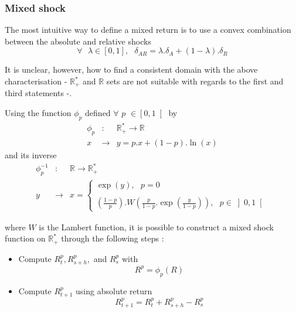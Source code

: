 \documentclass[10pt,a4paper]{report}
\begin{document}
\subsubsection{Mixed shock}

The most intuitive way to define a mixed return is to use a convex
combination between the absolute and relative shocks 
\begin{equation*}
\forall \text{ }\lambda \in \left[ 0,1\right] ,\text{ \ \ }\delta
_{AR}=\lambda .\delta _{A}+(1-\lambda ).\delta _{R}
\end{equation*}

It is unclear, however, how to find a consistent domain with the above
characterisation - $\mathbb{R}_{+}^{\ast }$ and $\mathbb{R}$ sets are not
suitable with regards to the first and third statements -.\\ 

\bigskip


Using the function $\phi _{p}$ defined $\forall $ $p$ $\in \left[ 0,1\right[ 
$ by%
\begin{eqnarray*}
\phi _{p} &:&\mathbb{R}_{+}^{\ast }\rightarrow \mathbb{R} \\
x &\rightarrow &y=p.x+(1-p).\ln (x)
\end{eqnarray*}%
and its inverse 
\begin{eqnarray*}
\phi _{p}^{-1} &:&\mathbb{R}\rightarrow \mathbb{R}_{+}^{\ast } \\
y &\rightarrow &x=\left\{ 
\begin{array}{c}
\exp (y),\text{ \ \ \ \ \ \ \ \ \ \ \ \ \ \ \ \ \ \ \ \ \ \ \ \ \ }p=0 \\ 
\\ 
\left( \frac{1-p}{p}\right) .W\left( \frac{p}{1-p}.\exp \left( \frac{y}{1-p}%
\right) \right) ,\text{ }p\in \left] 0,1\right[ 
\end{array}%
\right. 
\end{eqnarray*}

where $W$ is the Lambert function, it is possible to construct a mixed shock
function on $\mathbb{R}_{+}^{\ast }$ through the following steps :

\bigskip

\begin{itemize}
\item Compute $R_{t}^{p},R_{s+h}^{p},$ and $R_{s}^{p}$ with 
\begin{equation*}
R^{p}=\phi _{p}(R)
\end{equation*}

\item Compute $R_{t+1}^{p}$ using absolute return 
\begin{equation*}
R_{t+1}^{p}=R_{t}^{p}+R_{s+h}^{p}-R_{s}^{p}
\end{equation*}
\end{itemize}
\end{document}
